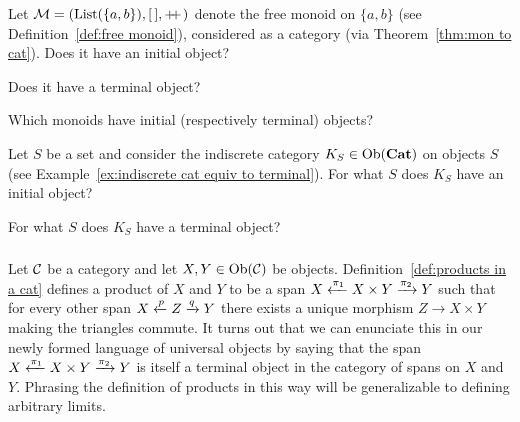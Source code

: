 \documentclass[../main/CT4S-EN-RU]{subfiles}
\begin{document}
\begin{exerciseENG}
Let $\mathcal{M}=(\operatorname{List}(\{a,b\}),[\,],+\!\!+\hspace{1pt})$ denote the free monoid on $\{a,b\}$ (see Definition~\ref{def:free monoid}), considered as a category (via Theorem~\ref{thm:mon to cat}).
\sexc Does it have an initial object?
\item Does it have a terminal object?
\item Which monoids have initial (respectively terminal) objects?
\endsexc
\end{exerciseENG}

\begin{exerciseRUS}
\end{exerciseRUS}

\begin{exerciseENG}
Let $S$ be a set and consider the indiscrete category $K_S\in\operatorname{Ob}({\mathbf{Cat}})$ on objects $S$ (see Example~\ref{ex:indiscrete cat equiv to terminal}).
\sexc For what $S$ does $K_S$ have an initial object?
\item For what $S$ does $K_S$ have a terminal object?
\endsexc
\end{exerciseENG}

\begin{exerciseRUS}
\end{exerciseRUS}


\subsubsection{}\label{sec:examples of limits}

\begin{blockENG}
Let $\mathcal{C}$ be a category and let $X,Y\in\operatorname{Ob}(\mathcal{C})$ be objects. Definition~\ref{def:products in a cat} defines a product  of $X$ and $Y$ to be a span $X\xleftarrow{\pi_1}X\times Y\xrightarrow{\pi_2}Y$ such that for every other span $X\xleftarrow{p}Z\xrightarrow{q}Y$ there exists a unique morphism $Z\to X\times Y$ making the triangles commute. It turns out that we can enunciate this in our newly formed language of universal objects by saying that the span $X\xleftarrow{\pi_1}X\times Y\xrightarrow{\pi_2}Y$ is itself a terminal object in the category of spans on $X$ and $Y.$ Phrasing the definition of products in this way will be generalizable to defining arbitrary limits.
\end{blockENG}

\begin{blockRUS}
\end{blockRUS}
\end{document}
